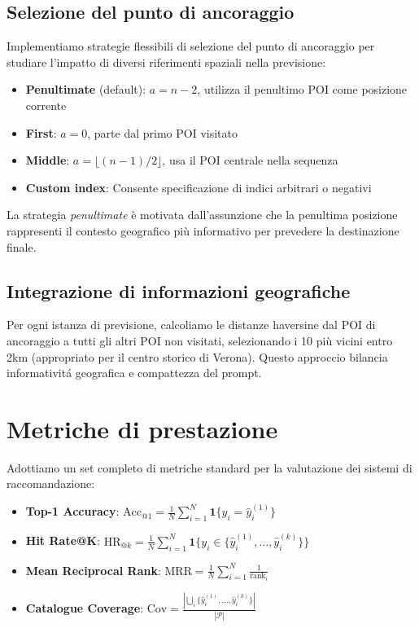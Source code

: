 \subsection{Selezione del punto di ancoraggio}\label{sec:anchor}

Implementiamo strategie flessibili di selezione del punto di ancoraggio per studiare l'impatto di diversi riferimenti spaziali nella previsione:

\begin{itemize}
\item \textbf{Penultimate} (default): $a = n-2$, utilizza il penultimo POI come posizione corrente
\item \textbf{First}: $a = 0$, parte dal primo POI visitato 
\item \textbf{Middle}: $a = \lfloor (n-1)/2 \rfloor$, usa il POI centrale nella sequenza
\item \textbf{Custom index}: Consente specificazione di indici arbitrari o negativi
\end{itemize}

La strategia \textit{penultimate} è motivata dall'assunzione che la penultima posizione rappresenti il contesto geografico più informativo per prevedere la destinazione finale.

\subsection{Integrazione di informazioni geografiche}

Per ogni istanza di previsione, calcoliamo le distanze haversine dal POI di ancoraggio a tutti gli altri POI non visitati, selezionando i 10 più vicini entro 2km (appropriato per il centro storico di Verona). Questo approccio bilancia informativitá geografica e compattezza del prompt.

\section{Metriche di prestazione}

Adottiamo un set completo di metriche standard per la valutazione dei sistemi di raccomandazione:

\begin{itemize}
\item \textbf{Top-1 Accuracy}: $\text{Acc}_{@1} = \frac{1}{N}\sum_{i=1}^{N}\mathbf{1}\{y_i = \hat{y}_i^{(1)}\}$
\item \textbf{Hit Rate@K}: $\text{HR}_{@k} = \frac{1}{N}\sum_{i=1}^{N}\mathbf{1}\{y_i \in \{\hat{y}_i^{(1)}, \ldots, \hat{y}_i^{(k)}\}\}$
\item \textbf{Mean Reciprocal Rank}: $\text{MRR} = \frac{1}{N}\sum_{i=1}^{N}\frac{1}{\text{rank}_i}$
\item \textbf{Catalogue Coverage}: $\text{Cov} = \frac{|\bigcup_i \{\hat{y}_i^{(1)}, \ldots, \hat{y}_i^{(k)}\}|}{|\mathcal{P}|}$
\end{itemize}

